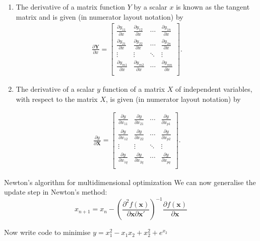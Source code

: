 \documentclass[10pt]{beamer}
\begin{document}
\begin{frame}[allowframebreaks]
\begin{enumerate}
  \item The derivative of a matrix function $Y$ by a scalar $x$ is known as the tangent
    matrix and is given (in numerator layout notation) by
    \begin{align*}
      \frac{\partial \mathbf{Y}}{\partial x} = \begin{bmatrix} \frac{\partial y_{11}}{\partial x} & \frac{\partial y_{12}}{\partial x} & \cdots & \frac{\partial y_{1n}}{\partial x}\\ \frac{\partial y_{21}}{\partial x} & \frac{\partial y_{22}}{\partial x} & \cdots & \frac{\partial y_{2n}}{\partial x}\\ \vdots & \vdots & \ddots & \vdots\\ \frac{\partial y_{m1}}{\partial x} & \frac{\partial y_{m2}}{\partial x} & \cdots & \frac{\partial y_{mn}}{\partial x}\\ \end{bmatrix}.
    \end{align*}

  \item The derivative of a scalar $y$ function of a matrix $X$ of independent variables, with respect to the matrix $X$, is given (in numerator layout notation) by

    \begin{align*}
      \frac{\partial y}{\partial \mathbf{X}} = \begin{bmatrix} \frac{\partial y}{\partial x_{11}} & \frac{\partial y}{\partial x_{21}} & \cdots & \frac{\partial y}{\partial x_{p1}}\\ \frac{\partial y}{\partial x_{12}} & \frac{\partial y}{\partial x_{22}} & \cdots & \frac{\partial y}{\partial x_{p2}}\\ \vdots & \vdots & \ddots & \vdots\\ \frac{\partial y}{\partial x_{1q}} & \frac{\partial y}{\partial x_{2q}} & \cdots & \frac{\partial y}{\partial x_{pq}}\\ \end{bmatrix}.
    \end{align*}

  \end{enumerate}


\end{frame}


\begin{frame}{Newton's algorithm for multidimensional optimization}
  We can now generalise the update step in Newton's method:
  \begin{equation}
    x_{n+1}=x_n-\left(\frac{\partial^2 f({\bm x})}{\partial {\bm x}\partial{\bm x}'}\right)^{-1}
    \frac{\partial f({\bm x})}{\partial {\bm x}}
  \end{equation}

  Now write code to minimise $y=x_1^2-x_1x_2+x_2^2+e^{x_2}$
\end{frame}
\end{document}

